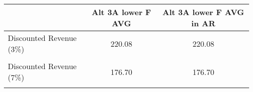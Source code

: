 \begin{tabular}{l*{2}{c}}
\hline\hline
                &Alt 3A lower F AVG&Alt 3A lower F AVG in AR\\
\hline
Discounted Revenue (3\%)&   220.08&   220.08\\
                &         &         \\
Discounted Revenue (7\%)&   176.70&   176.70\\
                &         &         \\
\hline\hline
\end{tabular}

